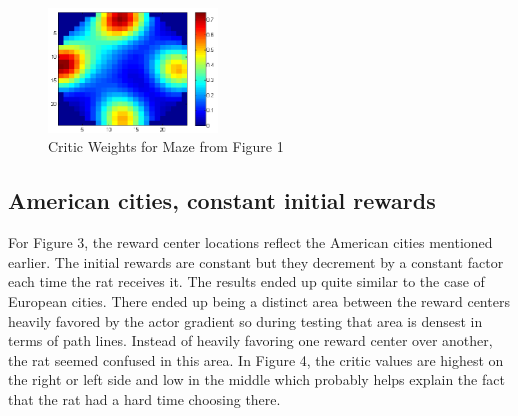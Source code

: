 \documentclass[conference]{IEEEtran}
\begin{document}
\begin{figure}
\includegraphics[width=0.4\textwidth]{waterMazeRevised2_Critic.png} 
\caption{Critic Weights for Maze from Figure 1}
\end{figure}

\subsection{American cities, constant initial rewards}

For Figure 3, the reward center locations reflect the American cities mentioned earlier. The initial rewards are constant but they decrement by a constant factor each time the rat receives it. The results ended up quite similar to the case of European cities. There ended up being a distinct area between the reward centers heavily favored by the actor gradient so during testing that area is densest in terms of path lines. Instead of heavily favoring one reward center over another, the rat seemed confused in this area. In Figure 4, the critic values are highest on the right or left side and low in the middle which probably helps explain the fact that the rat had a hard time choosing there.
\end{document}
